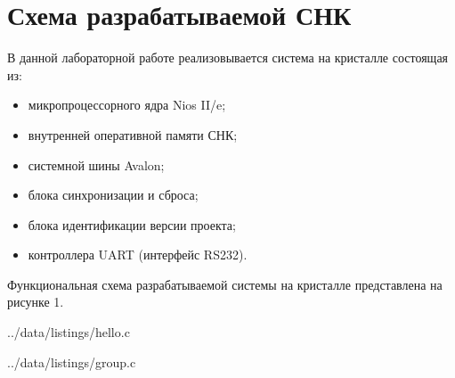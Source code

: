 \section*{Схема разрабатываемой СНК}

В данной лабораторной работе реализовывается система на кристалле состоящая из:
\begin{itemize}[left=\parindent]
    \item микропроцессорного ядра Nios II/e;
    \item внутренней оперативной памяти СНК;
    \item системной шины Avalon;
    \item блока синхронизации и сброса;
    \item блока идентификации версии проекта;
    \item контроллера UART (интерфейс RS232).
\end{itemize}

Функциональная схема разрабатываемой системы на кристалле представлена на
рисунке 1.




\newpage

\begin{lstinputlisting}[
	caption={Код эхо-программы приема-передачи по интерфейсу RS232},
	label={lst:echo},
	linerange={1-16}
]{../data/listings/hello.c}
\end{lstinputlisting}


\newpage

\begin{lstinputlisting}[
	caption={Код программы, передающей по UART значение SystemID},
	label={lst:group},
	linerange={1-23}
]{../data/listings/group.c}
\end{lstinputlisting}

